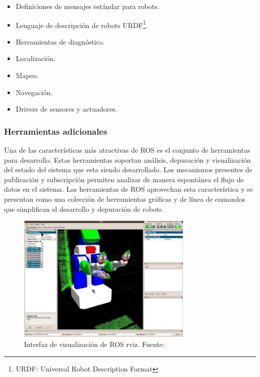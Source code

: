         \begin{itemize}
            \item Definiciones de mensajes estándar para robots.
            \item Lenguaje de descripción de robots URDF\footnote{URDF: Universal Robot Description Format}.
            \item Herramientas de diagnóstico.
            \item Localización.
            \item Mapeo.
            \item Navegación.
            \item Drivers de sensores y actuadores.
        \end{itemize}

        \subsubsection{Herramientas adicionales}
        Una de las características más atractivas de ROS es el conjunto de herramientas para desarrollo. Estas herramientas 
        soportan análisis, depuración y visualización del estado del sistema que esta siendo desarrollado. Los mecanismos presentes
        de publicación y subscripción permiten analizar de manera espontánea el flujo de datos en el sistema. Las herramientas 
        de ROS aprovechan esta característica y se presentan como una colección de herramientas gráficas y de línea de comandos que 
        simplifican el desarrollo y depuración de robots.

        \begin{figure}[!h] 
            \centering
            \includegraphics[width=0.75\textwidth]{img/rviz}
            \caption[Interfaz de visualización de ROS rviz]{Interfaz de visualización de ROS rviz. Fuente: \cite{roswiki} }
            \label{fig:rviz}
        \end{figure}

